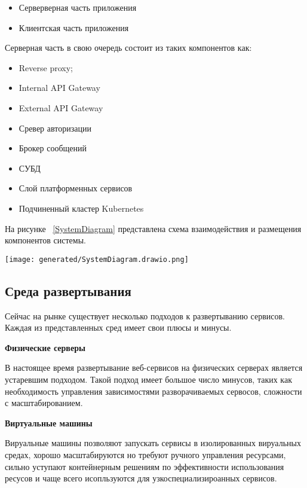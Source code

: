 \begin{itemize}
  \item[---] Серверверная часть приложения
  \item[---] Клиентская часть приложения 
\end{itemize}

Серверная часть в свою очередь состоит из таких компонентов как:

\begin{itemize}
  \item[---] Reverse proxy\cite{sommerlad2003reverse};
  \item[---] Internal API Gateway
  \item[---] External API Gateway
  \item[---] Сревер авторизации
  \item[---] Брокер сообщений
  \item[---] СУБД
  \item[---] Слой платформенных сервисов
  \item[---] Подчиненный кластер Kubernetes
\end{itemize}

На рисунке ~\ref{SystemDiagram} представлена схема взаимодействия и размещения компонентов системы.

\begin{figure*}[!t]
  \centering
  \texttt{[image: generated/SystemDiagram.drawio.png]}
  \caption{Компоненты плфтормы}
  \label{SystemDiagram}
\end{figure*}

\subsection{Среда развертывания}

Сейчас на рынке существует несколько подходов к развертыванию сервисов. Каждая из представленных сред имеет свои плюсы и минусы.

{\bf Физические серверы}

В настоящее время развертывание веб-сервисов на физических серверах является устаревшим подходом. Такой подход имеет большое число минусов, таких как необходимость управления зависимостями разворачиваемых сервосов, сложности с масштабированием.

{\bf Виртуальные машины}

Вируальные машины позволяют запускать сервисы в изолированных вируальных средах, хорошо масштабируются но требуют ручного управления ресурсами, сильно уступают контейнерным решениям по эффективности использования ресусов и чаще всего исопльзуются для узкоспециализироанных сервисов.

